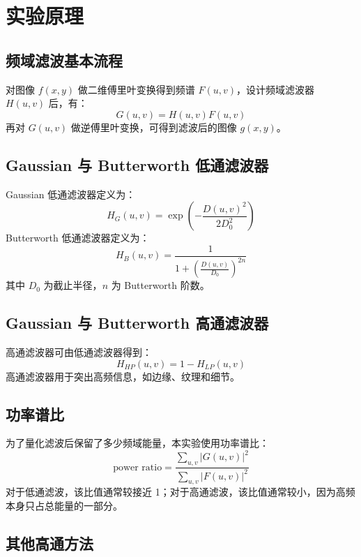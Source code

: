 \documentclass[UTF8,a4paper,12pt]{ctexart}
\begin{document}
\section{实验原理}
\subsection{频域滤波基本流程}
对图像 $f(x,y)$ 做二维傅里叶变换得到频谱 $F(u,v)$，设计频域滤波器 $H(u,v)$ 后，有：
\begin{equation}
G(u,v)=H(u,v)F(u,v)
\end{equation}
再对 $G(u,v)$ 做逆傅里叶变换，可得到滤波后的图像 $g(x,y)$。

\subsection{Gaussian 与 Butterworth 低通滤波器}
Gaussian 低通滤波器定义为：
\begin{equation}
H_G(u,v)=\exp\left(-\frac{D(u,v)^2}{2D_0^2}\right)
\end{equation}
Butterworth 低通滤波器定义为：
\begin{equation}
H_B(u,v)=\frac{1}{1+\left(\frac{D(u,v)}{D_0}\right)^{2n}}
\end{equation}
其中 $D_0$ 为截止半径，$n$ 为 Butterworth 阶数。

\subsection{Gaussian 与 Butterworth 高通滤波器}
高通滤波器可由低通滤波器得到：
\begin{equation}
H_{HP}(u,v)=1-H_{LP}(u,v)
\end{equation}
高通滤波器用于突出高频信息，如边缘、纹理和细节。

\subsection{功率谱比}
为了量化滤波后保留了多少频域能量，本实验使用功率谱比：
\begin{equation}
\text{power ratio}=
\frac{\sum\limits_{u,v}|G(u,v)|^2}{\sum\limits_{u,v}|F(u,v)|^2}
\end{equation}
对于低通滤波，该比值通常较接近 1；对于高通滤波，该比值通常较小，因为高频本身只占总能量的一部分。

\subsection{其他高通方法}
\end{document}
